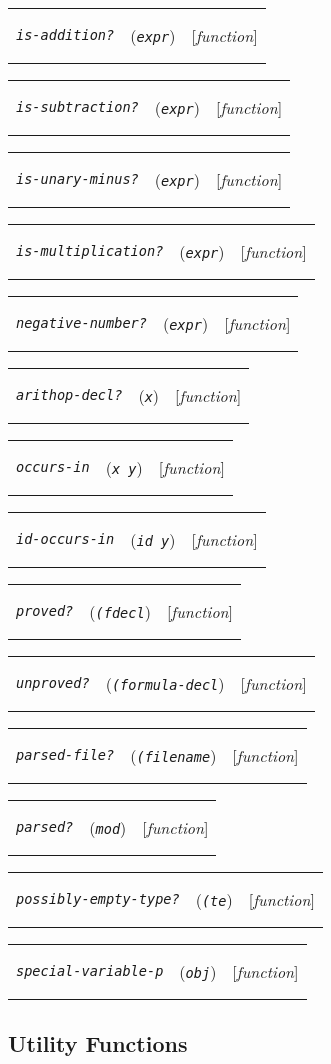 \documentclass[12pt]{book}
\makeatletter
\newenvironment{function}[3]%
{\par\noindent\begin{boxedminipage}{\textwidth}%
 \par\noindent\begin{tabularx}{\linewidth}{l>{\raggedright}Xr}%
 \functionhtgt{#1}&(\texttt{\textit{#2}})&[\emph{#3}]%
 \end{tabularx}\par\flushright\begin{minipage}{.97\textwidth}}
{\end{minipage}\end{boxedminipage}}
\newcommand{\functionnm}[1]{\texttt{\textit{#1}}}
\newcommand{\functionhtgt}[1]{\hypertarget{#1}{\functionnm{#1}}\index{#1@\functionnm{#1}|underline}}
\newenvironment{lispfunction}[2]%
{\begin{function}{#1}{#2}{function}}{\end{function}}
\makeatother
\begin{document}
\begin{lispfunction}{is-addition?}{expr}
\end{lispfunction}

\begin{lispfunction}{is-subtraction?}{expr}
\end{lispfunction}

\begin{lispfunction}{is-unary-minus?}{expr}
\end{lispfunction}

\begin{lispfunction}{is-multiplication?}{expr}
\end{lispfunction}

\begin{lispfunction}{negative-number?}{expr}
\end{lispfunction}

\begin{lispfunction}{arithop-decl?}{x}
\end{lispfunction}

\begin{lispfunction}{occurs-in}{x y}
\end{lispfunction}

\begin{lispfunction}{id-occurs-in}{id y}
\end{lispfunction}

\begin{lispfunction}{proved?}{(fdecl}
\end{lispfunction}

\begin{lispfunction}{unproved?}{(formula-decl}
\end{lispfunction}

\begin{lispfunction}{parsed-file?}{(filename}
\end{lispfunction}

\begin{lispfunction}{parsed?}{mod}
\end{lispfunction}

\begin{lispfunction}{possibly-empty-type?}{(te}
\end{lispfunction}

\begin{lispfunction}{special-variable-p}{obj}
\end{lispfunction}


\subsection{Utility Functions}
\end{document}

